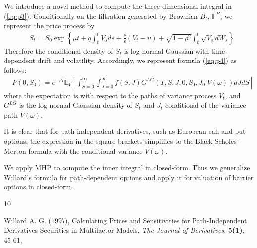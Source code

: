 \documentclass[pdftex,11pt,a4paper] {article}
\begin{document}
We introduce a novel method to compute the three-dimensional integral in (\ref{eq:p3}).
Conditionally on the filtration generated by Brownian $B_{t}$, $\mathbb{F}^{B}$, we represent the price process by
\begin{equation} \label {eq:p5}
\begin{split}
 & S_{t} = S_{0}\exp\left\{\mu t + q\int^{t}_{0}V_{s}ds + \frac{\rho}{\epsilon}\left(V_{t}- \upsilon\right) + \sqrt{1-\rho^{2}}\int^{t}_{0}\sqrt{V_{s}}dW_{s}\right\}
\end{split}
\end{equation}
Therefore the conditional density of $S_{t}$ is log-normal Gaussian with time-dependent drift and volatility. Accordingly, we represent formula (\ref{eq:p4}) as follows:
 \begin{equation} \label {eq:p4}
\begin{split}
& P(0, S_{0}) = e^{-rT} \mathbb{E}_{V} \left[\int^{\infty}_{S=0}\int^{\infty}_{J=0}f(S,J)G^{LG} \left(T, S,J; 0, S_{0}, J_{0}\left.\right|V(\omega)\right)dJdS \right]
\end{split}
\end{equation}
where the expectation is with respect to the paths of variance process $V_{t}$, and $G^{LG}$ is the log-normal Gaussian density of $S_{t}$ and $J_{t}$ conditional of the variance path $V(\omega)$.

It is clear that for path-independent derivatives, such as European call and put options, the expression in the square brackets simplifies to the Black-Scholes-Merton formula with the conditional variance $V(\omega)$.

We apply MHP to compute the inner integral in closed-form. Thus we generalize Willard's formula for path-dependent options and apply it for valuation of barrier options in closed-form.


\begin{thebibliography}{10}

  Willard A. G. (1997), Calculating Prices and Sensitivities for Path-Independent Derivatives Securities in Multifactor Models, \textit{The Journal of Derivatives}, \textbf{5(1)}, 45-61,



\end{thebibliography}
\end{document}
